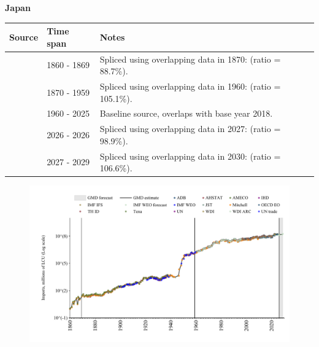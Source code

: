 \documentclass[12pt,a4paper,landscape]{article}
\begin{document}
\begin{adjustbox}{max totalsize={\paperwidth}{\paperheight},center}
\begin{minipage}[t][\textheight][t]{\textwidth}
\vspace*{0.5cm}
{}
\begin{center}
{\Large\bfseries Japan}
\end{center}
\vspace{0.5cm}
\begin{table}[H]
\centering
\small
\begin{tabular}{|l|l|l|}
\hline
\textbf{Source} & \textbf{Time span} & \textbf{Notes} \\
\hline
\rowcolor{white}\cite{Tena}& 1860 - 1869 &Spliced using overlapping data in 1870: (ratio = 88.7\%).\\
\rowcolor{lightgray}\cite{JST}& 1870 - 1959 &Spliced using overlapping data in 1960: (ratio = 105.1\%).\\
\rowcolor{white}\cite{OECD_EO}& 1960 - 2025 &Baseline source, overlaps with base year 2018.\\
\rowcolor{lightgray}\cite{AMECO}& 2026 - 2026 &Spliced using overlapping data in 2027: (ratio = 98.9\%).\\
\rowcolor{white}\cite{IMF_WEO_forecast}& 2027 - 2029 &Spliced using overlapping data in 2030: (ratio = 106.6\%).\\
\hline
\end{tabular}
\end{table}
\begin{figure}[H]
\centering
\includegraphics[width=\textwidth,height=0.6\textheight,keepaspectratio]{graphs/JPN_imports.pdf}
\end{figure}
\end{minipage}
\end{adjustbox}
\end{document}
